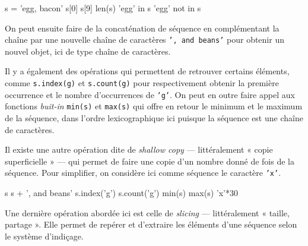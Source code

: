 \begin{idleconsole}
	\begin{pyconsole}
s = 'egg, bacon'
s[0]
s[9]
len(s)
'egg' in s
'egg' not in s
	\end{pyconsole}
\end{idleconsole}

On peut ensuite faire de la concaténation de séquence en complémentant la chaîne par une nouvelle chaîne de caractères \texttt{', and beans'} pour obtenir un nouvel objet, ici de type chaîne de caractères. 

Il y a également des opérations qui permettent de retrouver certains éléments, comme \texttt{s.index(g)} et \texttt{s.count(g)} pour respectivement obtenir la première occurrence et le nombre d’occurrences de \texttt{'g'}. On peut en outre faire appel aux fonctions \textit{buit-in} \texttt{min(s)} et \texttt{max(s)} qui offre en retour le minimum et le maximum de la séquence, dans l'ordre lexicographique ici puisque la séquence est une chaîne de caractères.

Il existe une autre opération dite de \textit{shallow copy} --- littéralement « copie superficielle » --- qui permet de faire une copie d'un nombre donné de fois de la séquence. Pour simplifier, on considère ici comme séquence le caractère \texttt{'x'}. 

\begin{idleconsole}
	\begin{pyconsole}
s 
s + ', and beans'
s.index('g')
s.count('g')
min(s)
max(s)
'x'*30
	\end{pyconsole}
\end{idleconsole}

Une dernière opération abordée ici est celle de \textit{slicing} --- littéralement « taille, partage ». Elle permet de repérer et d'extraire les éléments d'une séquence selon le système d'indiçage. 

